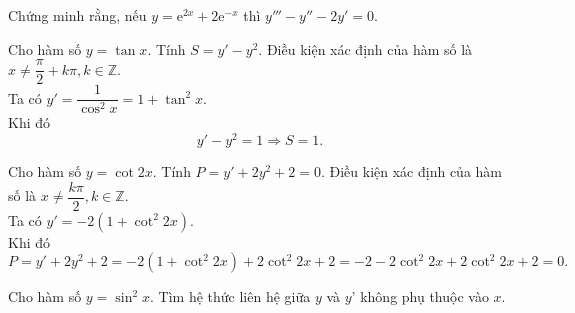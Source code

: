 \begin{ex}%
	Chứng minh rằng,  nếu $y=\mathrm{e}^{2 x}+2 \mathrm{e}^{-x}$ thì $y'''-y''-2 y'=0$.
\end{ex}

\begin{bt}%
	Cho hàm số $y=\tan x$. Tính $S=y'-y^2$.
	\loigiai
	{
		Điều kiện xác định của hàm số là $x\neq \dfrac{\pi}{2}+k\pi, k\in \mathbb{Z}$.\\
		Ta có $y'=\dfrac{1}{\cos^2 x}=1+\tan^2 x$.\\
		Khi đó
		\[y'-y^2 = 1\Rightarrow S=1.\]
			}
\end{bt}

\begin{bt}%
Cho hàm số $y=\cot 2x$. Tính $P=y'+2y^2+2=0$.
	\loigiai
	{
		Điều kiện xác định của hàm số là $x\neq \dfrac{k\pi}{2}, k\in \mathbb{Z}$.\\
		Ta có $y'=-2\left(1+\cot^2 2x\right)$.\\
		Khi đó
		\[P=y'+2y^2+2 = -2\left(1+\cot^2 2x\right)+2\cot^2 2x+2 = -2-2\cot^2 2x+2\cot^2 2x+2 = 0.\]
			}
\end{bt}

\begin{bt}%

	Cho hàm số $y = \sin ^2 x$. Tìm hệ thức liên hệ giữa $y$ và $y’$ không phụ thuộc vào $x$.
\end{bt}

